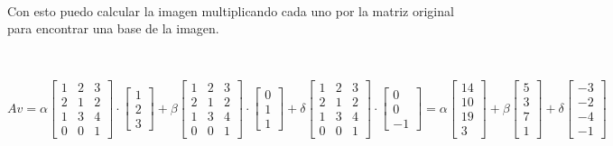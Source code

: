 \documentclass{article}
\begin{document}
\

\noindent Con esto puedo calcular la imagen multiplicando cada uno por la matriz original para encontrar una base de la imagen.

\

\[Av = 
\alpha\begin{bmatrix}
    1 & 2 & 3 \\
    2 & 1 & 2 \\
    1 & 3 & 4 \\
    0 & 0 & 1
\end{bmatrix}\cdot
\begin{bmatrix}
    1 \\
    2 \\
    3
\end{bmatrix}
+
\beta\begin{bmatrix}
    1 & 2 & 3 \\
    2 & 1 & 2 \\
    1 & 3 & 4 \\
    0 & 0 & 1
\end{bmatrix}\cdot
\begin{bmatrix}
    0 \\
    1 \\
    1
\end{bmatrix}
+
\delta\begin{bmatrix}
    1 & 2 & 3 \\
    2 & 1 & 2 \\
    1 & 3 & 4 \\
    0 & 0 & 1
\end{bmatrix}\cdot
\begin{bmatrix}
    0 \\
    0 \\
    -1
\end{bmatrix}
=
\alpha\begin{bmatrix}
    14 \\
    10 \\
    19 \\
    3 
\end{bmatrix}
+
\beta\begin{bmatrix}
    5 \\
    3 \\
    7 \\
    1 
\end{bmatrix}
+
\delta\begin{bmatrix}
    -3 \\
    -2 \\
    -4 \\
    -1
\end{bmatrix}
\]
\end{document}
